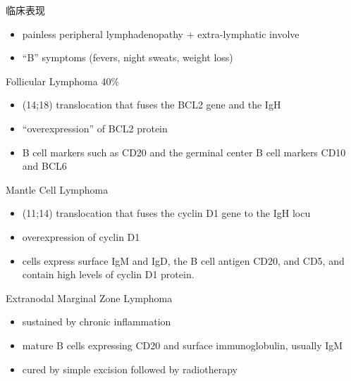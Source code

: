 \documentclass[
  ignorenonframetext,
]{beamer}
\begin{document}
\begin{frame}
\begin{block}{临床表现}
\protect\hypertarget{ux4e34ux5e8aux8868ux73b0-9}{}
\begin{itemize}
\item
  painless peripheral lymphadenopathy + extra-lymphatic involve
\item
  ``B'' symptoms (fevers, night sweats, weight loss)
\end{itemize}
\end{block}
\end{frame}

\begin{frame}
\begin{block}{Follicular Lymphoma 40\%}
\protect\hypertarget{follicular-lymphoma-40}{}
\begin{itemize}
\item
  (14;18) translocation that fuses the BCL2 gene and the IgH
\item
  ``overexpression'' of BCL2 protein
\item
  B cell markers such as CD20 and the germinal center B cell markers
  CD10 and BCL6
\end{itemize}
\end{block}
\end{frame}

\begin{frame}
\begin{block}{Mantle Cell Lymphoma}
\protect\hypertarget{mantle-cell-lymphoma}{}
\begin{itemize}
\item
  (11;14) translocation that fuses the cyclin D1 gene to the IgH locu
\item
  overexpression of cyclin D1
\item
  cells express surface IgM and IgD, the B cell antigen CD20, and CD5,
  and contain high levels of cyclin D1 protein.
\end{itemize}
\end{block}
\end{frame}

\begin{frame}
\begin{block}{Extranodal Marginal Zone Lymphoma}
\protect\hypertarget{extranodal-marginal-zone-lymphoma}{}
\begin{itemize}
\item
  sustained by chronic inflammation
\item
  mature B cells expressing CD20 and surface immunoglobulin, usually IgM
\item
  cured by simple excision followed by radiotherapy
\end{itemize}
\end{block}
\end{frame}
\end{document}
